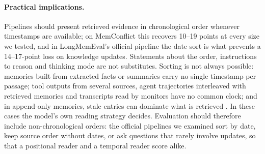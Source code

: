 \documentclass[11pt]{article}
\begin{document}
\paragraph{Practical implications.}
Pipelines should present retrieved evidence in chronological order whenever timestamps are available; on MemConflict this recovers 10--19 points at every size we tested, and in LongMemEval's official pipeline the date sort is what prevents a 14--17-point loss on knowledge updates. Statements about the order, instructions to reason and thinking mode are not substitutes. Sorting is not always possible: memories built from extracted facts or summaries carry no single timestamp per passage; tool outputs from several sources, agent trajectories interleaved with retrieved memories and transcripts read by monitors have no common clock; and in append-only memories, stale entries can dominate what is retrieved \citep{haddadpajouh2026mutable}. In these cases the model's own reading strategy decides. Evaluation should therefore include non-chronological orders: the official pipelines we examined sort by date, keep source order without dates, or ask questions that rarely involve updates, so that a positional reader and a temporal reader score alike.
\end{document}
